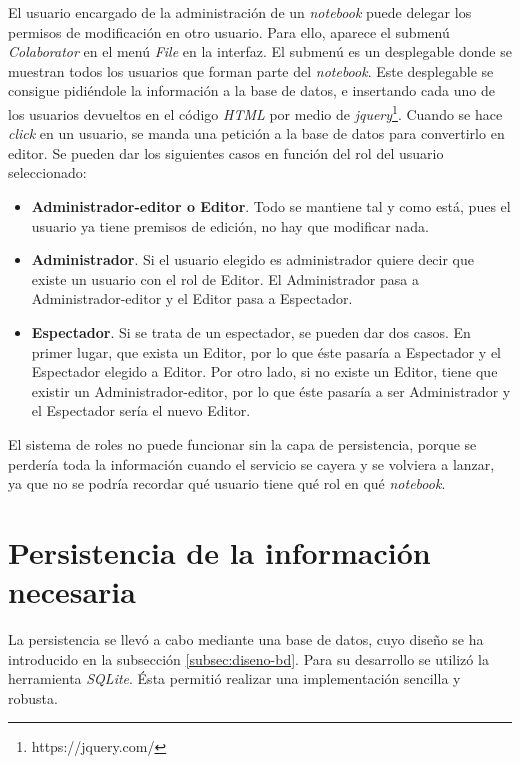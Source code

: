 \documentclass[11pt,spanish,listoffigures]{tfgetsinf}
\begin{document}
El usuario encargado de la administración de un \textit{notebook} puede delegar los permisos de modificación en otro usuario. Para ello, aparece el submenú \textit{Colaborator} en el menú \textit{File} en la interfaz. El submenú es un desplegable donde se muestran todos los usuarios que forman parte del \textit{notebook}. Este desplegable se consigue pidiéndole la información a la base de datos, e insertando cada uno de los usuarios devueltos en el código \textit{HTML} por medio de \textit{\gls{jquery}}\footnote{https://jquery.com/}. Cuando se hace \textit{click} en un usuario, se manda una petición a la base de datos para convertirlo en editor. Se pueden dar los siguientes casos en función del rol del usuario seleccionado:

\begin{itemize}

\item \textbf{Administrador-editor o Editor}. Todo se mantiene tal y como está, pues el usuario ya tiene premisos de edición, no hay que modificar nada.

\item \textbf{Administrador}. Si el usuario elegido es administrador quiere decir que existe un usuario con el rol de Editor. El Administrador pasa a Administrador-editor y el Editor pasa a Espectador.

\item \textbf{Espectador}. Si se trata de un espectador, se pueden dar dos casos. En primer lugar, que exista un Editor, por lo que éste pasaría a Espectador y el Espectador elegido a Editor. Por otro lado, si no existe un Editor, tiene que existir un Administrador-editor, por lo que éste pasaría a ser Administrador y el Espectador sería el nuevo Editor.

\end{itemize}

El sistema de roles no puede funcionar sin la capa de persistencia, porque se perdería toda la información cuando el servicio se cayera y se volviera a lanzar, ya que no se podría recordar qué usuario tiene qué rol en qué \textit{notebook}.



\section{Persistencia de la información necesaria}
\label{sec:desarrollo-persistencia}

La persistencia se llevó a cabo mediante una base de datos, cuyo diseño se ha introducido en la subsección \ref{subsec:diseno-bd}. Para su desarrollo se utilizó la herramienta \textit{SQLite}. Ésta permitió realizar una implementación sencilla y robusta. 
\end{document}
